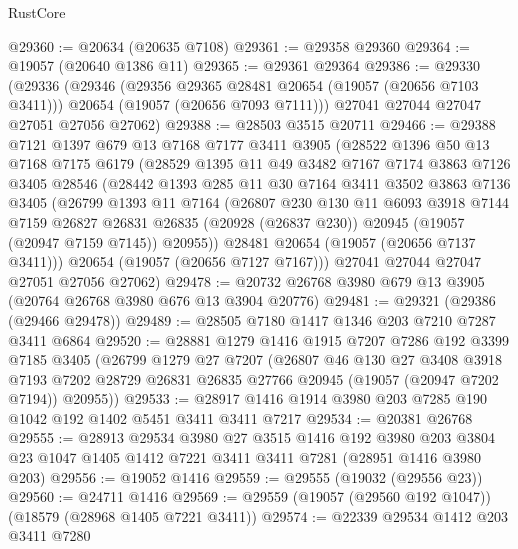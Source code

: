 \begin{lexlean}{RustCore}
\begin{coremodule}
@29360 := @20634 (@20635 @7108)
@29361 := @29358 @29360
@29364 := @19057 (@20640 @1386 @11)
@29365 := @29361 @29364
@29386 := @29330
    (@29336
      (@29346
        (@29356 @29365 @28481 @20654 (@19057 (@20656 @7103 @3411)))
        @20654
        (@19057 (@20656 @7093 @7111)))
      @27041
      @27044
      @27047
      @27051
      @27056
      @27062)
@29388 := @28503 @3515 @20711
@29466 := @29388
    @7121
    @1397
    @679
    @13
    @7168
    @7177
    @3411
    @3905
    (@28522
      @1396
      @50
      @13
      @7168
      @7175
      @6179
      (@28529
        @1395
        @11
        @49
        @3482
        @7167
        @7174
        @3863
        @7126
        @3405
        @28546
        (@28442
          @1393
          @285
          @11
          @30
          @7164
          @3411
          @3502
          @3863
          @7136
          @3405
          (@26799
            @1393
            @11
            @7164
            (@26807
              @230
              @130
              @11
              @6093
              @3918
              @7144
              @7159
              @26827
              @26831
              @26835
              (@20928 (@26837 @230))
              @20945
              (@19057 (@20947 @7159 @7145))
              @20955))
          @28481
          @20654
          (@19057 (@20656 @7137 @3411)))
        @20654
        (@19057 (@20656 @7127 @7167)))
      @27041
      @27044
      @27047
      @27051
      @27056
      @27062)
@29478 := @20732 @26768 @3980 @679 @13 @3905 (@20764 @26768 @3980 @676 @13 @3904 @20776)
@29481 := @29321 (@29386 (@29466 @29478))
@29489 := @28505 @7180 @1417 @1346 @203 @7210 @7287 @3411 @6864
@29520 := @28881
    @1279
    @1416
    @1915
    @7207
    @7286
    @192
    @3399
    @7185
    @3405
    (@26799
      @1279
      @27
      @7207
      (@26807
        @46
        @130
        @27
        @3408
        @3918
        @7193
        @7202
        @28729
        @26831
        @26835
        @27766
        @20945
        (@19057 (@20947 @7202 @7194))
        @20955))
@29533 := @28917 @1416 @1914 @3980 @203 @7285 @190 @1042 @192 @1402 @5451 @3411 @3411 @7217
@29534 := @20381 @26768
@29555 := @28913
    @29534
    @3980
    @27
    @3515
    @1416
    @192
    @3980
    @203
    @3804
    @23
    @1047
    @1405
    @1412
    @7221
    @3411
    @3411
    @7281
    (@28951 @1416 @3980 @203)
@29556 := @19052 @1416
@29559 := @29555 (@19032 (@29556 @23))
@29560 := @24711 @1416
@29569 := @29559 (@19057 (@29560 @192 @1047)) (@18579 (@28968 @1405 @7221 @3411))
@29574 := @22339 @29534 @1412 @203 @3411 @7280

\end{coremodule}
\end{lexlean}
